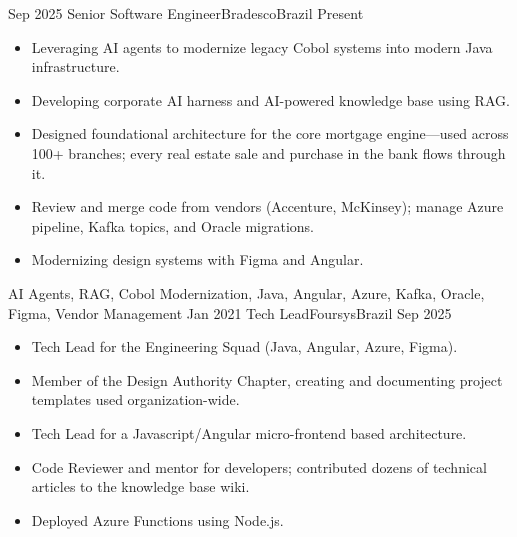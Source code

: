 %
%
%
\begin{experiences}
  \experience
    {Sep 2025}   {Senior Software Engineer}{Bradesco}{Brazil}
    {Present} {
                      \begin{itemize}
                        \item Leveraging AI agents to modernize legacy Cobol systems into modern Java infrastructure.
                        \item Developing corporate AI harness and AI-powered knowledge base using RAG.
                        \item Designed foundational architecture for the core mortgage engine—used across 100+ branches; every real estate sale and purchase in the bank flows through it.
                        \item Review and merge code from vendors (Accenture, McKinsey); manage Azure pipeline, Kafka topics, and Oracle migrations.
                        \item Modernizing design systems with Figma and Angular.
                      \end{itemize}
                    }
                    {AI Agents, RAG, Cobol Modernization, Java, Angular, Azure, Kafka, Oracle, Figma, Vendor Management}
  \emptySeparator
  \experience
    {Jan 2021}   {Tech Lead}{Foursys}{Brazil}
    {Sep 2025} {
                      \begin{itemize}
                        \item Tech Lead for the Engineering Squad (Java, Angular, Azure, Figma).
                        \item Member of the Design Authority Chapter, creating and documenting project templates used organization-wide.
                        \item Tech Lead for a Javascript/Angular micro-frontend based architecture.
                        \item Code Reviewer and mentor for developers; contributed dozens of technical articles to the knowledge base wiki.
                        \item Deployed Azure Functions using Node.js.
                      \end{itemize}
}
\end{experiences}
